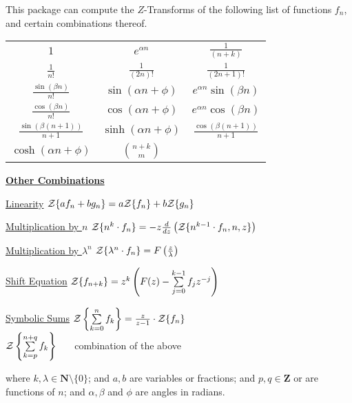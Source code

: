 This package can compute the $Z$-Transforms of the following
list of functions $f_n$, and certain combinations thereof.
\begin{center}
  \renewcommand{\arraystretch}{2}
  \setlength{\tabcolsep}{5mm}
  \begin{tabular}{ccc}
    $1$ & $e^{\alpha n}$ & $\frac{1}{(n+k)}$ \\
    $\frac{1}{n!}$ & $\frac{1}{(2n)!}$ & $\frac{1}{(2n+1)!}$ \\
    $\frac{\sin(\beta n)}{n!}$ & $\sin(\alpha n+\phi)$ & $e^{\alpha n} \sin(\beta n)$ \\
    $\frac{\cos(\beta n)}{n!}$ & $\cos(\alpha n+\phi)$ & $e^{\alpha n} \cos(\beta n)$ \\
    $\frac{\sin(\beta (n+1))}{n+1}$ & $\sinh(\alpha n+\phi)$ & $\frac{\cos(\beta (n+1))}{n+1}$ \\
    $\cosh(\alpha n+\phi)$ & $\binom{n+k}{m}$
  \end{tabular}
\end{center}

\underline{\textbf{Other Combinations}}

\begin{list}{}{
    \setlength{\leftmargin}{35mm}
    \setlength{\labelwidth}{\leftmargin}\addtolength{\labelwidth}{-\labelsep}
    \renewcommand{\makelabel}[1]{#1}
  }
\item[\underline{Linearity}]
  ${\cal Z} \{a f_n+b g_n \} = a{\cal Z} \{f_n\}+b{\cal Z}\{g_n\}$
\item[\underline{Multiplication by $n$}]
  ${\cal Z} \{n^k \cdot f_n\} = -z \frac{d}{dz} \left({\cal Z}\{n^{k-1} \cdot f_n,n,z\} \right)$
\item[\underline {Multiplication by $\lambda^n$}]
  ${\cal Z} \{\lambda^n \cdot f_n\}=F \left(\frac{z}{\lambda}\right)$
\item[\underline {Shift Equation}]
  ${\cal Z} \{f_{n+k}\} =
           z^k \left(F(z) - \sum\limits^{k-1}_{j=0} f_j z^{-j}\right)$
\item[\underline {Symbolic Sums}]
  ${\cal Z} \left\{ \sum\limits_{k=0}^{n} f_k \right\} =
  \frac{z}{z-1} \cdot {\cal Z} \{f_n\}$ \\[\baselineskip]
  ${\cal Z} \left\{ \sum\limits_{k=p}^{n+q} f_k \right\}$
  \ \ \ combination of the above
\end{list}

where $k,\lambda \in \mathbf{N} \setminus \{0\}$; and $a,b$ are variables or
fractions; and $p,q \in \mathbf{Z}$ or are functions of $n$; and
$\alpha,\beta$ and $\phi$ are angles in radians.

